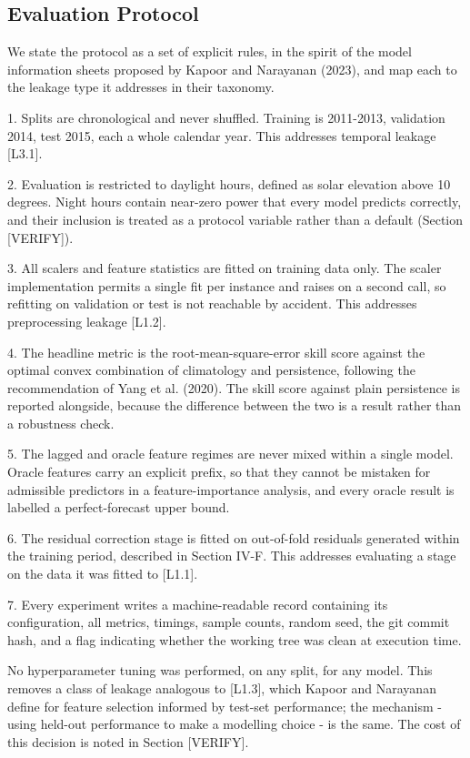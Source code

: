 \subsection{Evaluation Protocol}

We state the protocol as a set of explicit rules, in the spirit of the
model information sheets proposed by Kapoor and Narayanan (2023), and
map each to the leakage type it addresses in their taxonomy.

1. Splits are chronological and never shuffled. Training is 2011-2013,
   validation 2014, test 2015, each a whole calendar year. This
   addresses temporal leakage [L3.1].

2. Evaluation is restricted to daylight hours, defined as solar
   elevation above 10 degrees. Night hours contain near-zero power that
   every model predicts correctly, and their inclusion is treated as a
   protocol variable rather than a default (Section [VERIFY]).

3. All scalers and feature statistics are fitted on training data only.
   The scaler implementation permits a single fit per instance and
   raises on a second call, so refitting on validation or test is not
   reachable by accident. This addresses preprocessing leakage [L1.2].

4. The headline metric is the root-mean-square-error skill score against
   the optimal convex combination of climatology and persistence,
   following the recommendation of Yang et al. (2020). The skill score
   against plain persistence is reported alongside, because the
   difference between the two is a result rather than a robustness
   check.

5. The lagged and oracle feature regimes are never mixed within a
   single model. Oracle features carry an explicit prefix, so that they
   cannot be mistaken for admissible predictors in a feature-importance
   analysis, and every oracle result is labelled a perfect-forecast
   upper bound.

6. The residual correction stage is fitted on out-of-fold residuals
   generated within the training period, described in Section IV-F.
   This addresses evaluating a stage on the data it was fitted to
   [L1.1].

7. Every experiment writes a machine-readable record containing its
   configuration, all metrics, timings, sample counts, random seed, the
   git commit hash, and a flag indicating whether the working tree was
   clean at execution time.

No hyperparameter tuning was performed, on any split, for any model.
This removes a class of leakage analogous to [L1.3], which Kapoor and
Narayanan define for feature selection informed by test-set performance;
the mechanism - using held-out performance to make a modelling choice -
is the same. The cost of this decision is noted in Section [VERIFY].

